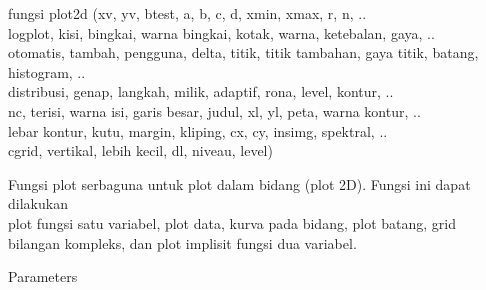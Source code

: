 \documentclass[a4paper,10pt]{article}
\begin{document}
\begin{eulernotebook}
\begin{eulercomment}
\begin{eulercomment}
\begin{eulercomment}
\begin{eulercomment}
\begin{eulercomment}
\begin{eulercomment}
\begin{eulercomment}
\begin{eulercomment}
\begin{eulercomment}
\begin{eulercomment}
\begin{eulercomment}
\begin{eulercomment}
\begin{eulercomment}
\begin{eulercomment}
\begin{eulercomment}
\begin{eulercomment}
\begin{eulercomment}
\begin{eulercomment}
\begin{eulercomment}
\begin{eulercomment}
\begin{eulercomment}
\begin{eulercomment}
\begin{eulercomment}
\begin{eulercomment}
\begin{eulercomment}
\begin{eulercomment}
\begin{eulercomment}
\begin{eulercomment}
\begin{eulercomment}
\begin{eulercomment}
\begin{eulercomment}
\begin{eulercomment}
\begin{eulercomment}
\begin{eulercomment}
\begin{eulercomment}
\begin{eulercomment}
\begin{eulercomment}
\begin{eulercomment}
\begin{eulercomment}
fungsi plot2d (xv, yv, btest, a, b, c, d, xmin, xmax, r, n, ..\\
logplot, kisi, bingkai, warna bingkai, kotak, warna, ketebalan, gaya,
..\\
otomatis, tambah, pengguna, delta, titik, titik tambahan, gaya titik,
batang, histogram, ..\\
distribusi, genap, langkah, milik, adaptif, rona, level, kontur, ..\\
nc, terisi, warna isi, garis besar, judul, xl, yl, peta, warna kontur,
..\\
lebar kontur, kutu, margin, kliping, cx, cy, insimg, spektral, ..\\
cgrid, vertikal, lebih kecil, dl, niveau, level)

Fungsi plot serbaguna untuk plot dalam bidang (plot 2D). Fungsi ini
dapat dilakukan\\
plot fungsi satu variabel, plot data, kurva pada bidang, plot batang,
grid\\
bilangan kompleks, dan plot implisit fungsi dua variabel.

Parameters


\end{eulercomment}
\end{eulercomment}
\end{eulercomment}
\end{eulercomment}
\end{eulercomment}
\end{eulercomment}
\end{eulercomment}
\end{eulercomment}
\end{eulercomment}
\end{eulercomment}
\end{eulercomment}
\end{eulercomment}
\end{eulercomment}
\end{eulercomment}
\end{eulercomment}
\end{eulercomment}
\end{eulercomment}
\end{eulercomment}
\end{eulercomment}
\end{eulercomment}
\end{eulercomment}
\end{eulercomment}
\end{eulercomment}
\end{eulercomment}
\end{eulercomment}
\end{eulercomment}
\end{eulercomment}
\end{eulercomment}
\end{eulercomment}
\end{eulercomment}
\end{eulercomment}
\end{eulercomment}
\end{eulercomment}
\end{eulercomment}
\end{eulercomment}
\end{eulercomment}
\end{eulercomment}
\end{eulercomment}
\end{eulercomment}
\end{eulernotebook}
\end{document}
